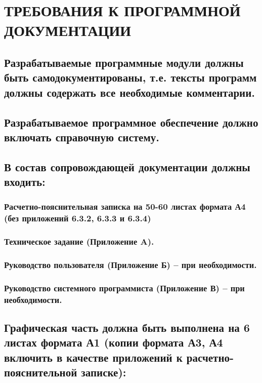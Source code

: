 \documentclass[utf8x, 12pt, oneside, a4paper]{article}
\begin{document}
		
	\section{ТРЕБОВАНИЯ К ПРОГРАММНОЙ ДОКУМЕНТАЦИИ}

	\subsection{Разрабатываемые программные модули должны быть самодокументированы, т.е. тексты программ должны содержать все необходимые комментарии.}
	
	\subsection{Разрабатываемое программное обеспечение должно включать справочную систему.}
	
	\subsection{В состав сопровождающей документации должны входить:}

	\subsubsection{Расчетно-пояснительная записка на \textbf{50-60} листах формата А4 (без приложений 6.3.2, 6.3.3 и 6.3.4)} %

	\subsubsection{Техническое задание (Приложение A).}

	\subsubsection{\textbf{Руководство пользователя (Приложение Б) – при необходимости.}}

	\subsubsection{\textbf{Руководство системного программиста (Приложение В) – при необходимости.}}

	\subsection{Графическая часть должна быть выполнена на \textbf{6} листах формата А1 (копии формата А3, А4 включить в качестве приложений к расчетно-пояснительной записке):} %
\end{document}

